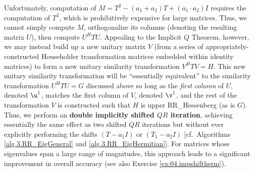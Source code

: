 Unfortunately, computation of $M=T^2 - (a_1+a_2) T + (a_1\cdot a_2) I$ requires the computation of $T^2$, which is prohibitively expensive for large matrices.  Thus, we cannot simply
compute $M$, orthogonalize its columns (denoting the resulting matrix $U$), then compute $U^H T U$.  Appealing to the Implicit $Q$ Theorem, however, we may instead build up a new unitary
matrix $V$ (from a series of appropriately-constructed Householder transformation matrices embedded within identity matrices) to form a new unitary similarity transformation $V^H T V=H$.
This new unitary similarity transformation will be ``essentially equivalent'' to the similarity transformation $U^H T U =G$ discussed above so long as the {\it first column} of $U$, denoted $\u^1$, matches the first column of $V$, denoted $\v^1$,
and the rest of the transformation $V$ is constructed such that $H$ is upper RR_Hessenberg (as is $G$).  Thus, we perform an {\bf double implicitly shifted $QR$ iteration},
achieving essentially the same effect as two shifted $QR$ iterations but without ever explicitly performing the shifts $(T-a_1 I)$ or $(T_1-a_2 I)$ [cf.~Algorithms \ref{alg.3.RR_EigGeneral} and
\ref{alg.3.RR_EigHermitian}].  For matrices whose eigenvalues span a large range of magnitudes, this approach leads to a significant improvement in overall accuracy (see also Exercise
\ref{ex:04.impshiftherm}).

